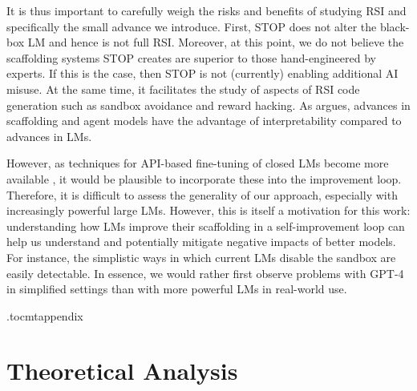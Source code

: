 \documentclass{article} %
\begin{document}
It is thus important to carefully weigh the risks and benefits of studying RSI and specifically the small advance we introduce. First, STOP does not alter the black-box LM and hence is not full RSI. Moreover, at this point, we do not believe the scaffolding systems STOP creates are superior to those hand-engineered by experts. If this is the case, then STOP is not (currently) enabling additional AI misuse. At the same time, it facilitates the study of aspects of RSI code generation such as sandbox avoidance and reward hacking. As \citet{paulfchristiano_thoughts_2023paper} argues, advances in scaffolding and agent models have the advantage of interpretability compared to advances in LMs.

However, as techniques for API-based fine-tuning of closed LMs become more available \citep{gpt3finetuning}, it would be plausible to incorporate these into the improvement loop. Therefore, it is difficult to assess the generality of our approach, especially with increasingly powerful large LMs. However, this is itself a motivation for this work: understanding how LMs improve their scaffolding in a self-improvement loop can help us understand and potentially mitigate negative impacts of better models. For instance, the simplistic ways in which current LMs disable the sandbox are easily detectable. In essence, we would rather first observe problems with GPT-4 in simplified settings than with more powerful LMs in real-world use.


%
%
%
%





\newpage
%
%

\appendix
\renewcommand{\thefigure}{A.\arabic{figure}}
\setcounter{table}{0}  %
\renewcommand{\thetable}{A.\arabic{table}}

%
%
%
%
%
%
%
%
%
%
%
%
%
%
%
%
%
%
%
%
%
%
%
%
%
%

%
%
%
%
%
%
    \etocdepthtag.toc{mtappendix}
    {\small\tableofcontents}

\clearpage
\pagebreak

%
%
%
%
%
%
%
%
%
%
%
%
%
%
%
%
%
%
%
%
%
%
%
%
%
\section{Theoretical Analysis}\label{ap:theory}
\end{document}
